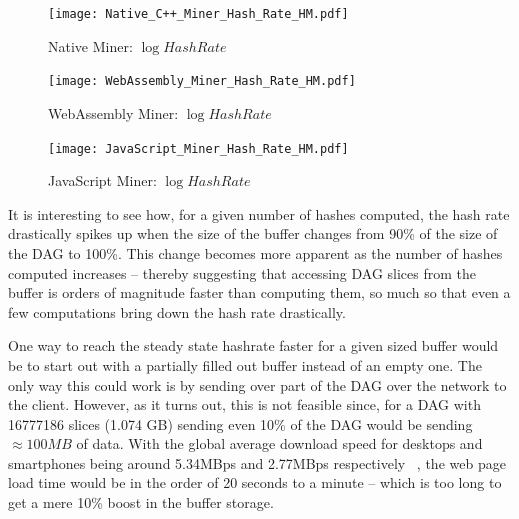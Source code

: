 \documentclass[runningheads]{llncs}
\begin{document}
\begin{figure}[h]
\centering
\texttt{[image: Native\_C++\_Miner\_Hash\_Rate\_HM.pdf]}
\caption{\label{fig:NativeMinerHM} Native Miner: $\log{Hash Rate}$}
\end{figure}

\begin{figure}[h]
\centering
\texttt{[image: WebAssembly\_Miner\_Hash\_Rate\_HM.pdf]}
\caption{\label{fig:WebAsmMinerHM} WebAssembly Miner: $\log{Hash Rate}$}
\end{figure}

\begin{figure}[h]
\centering
\texttt{[image: JavaScript\_Miner\_Hash\_Rate\_HM.pdf]}
\caption{\label{fig:JSMinerHM} JavaScript Miner: $\log{Hash Rate}$}
\end{figure}


It is interesting to see how, for a given number of hashes computed, the hash rate drastically spikes up when the size of the buffer changes from 90\% of the size of the DAG to 100\%. This change becomes more apparent as the number of hashes computed increases -- thereby suggesting that accessing DAG slices from the buffer is orders of magnitude faster than computing them, so much so that even a few computations bring down the hash rate drastically. 

One way to reach the steady state hashrate faster for a given sized buffer would be to start out with a partially filled out buffer instead of an empty one. The only way this could work is by sending over part of the DAG over the network to the client. However, as it turns out, this is not feasible since, for a DAG with 16777186 slices (1.074 GB) sending even 10\% of the DAG would be sending $\approx100MB$ of data. With the global average download speed for desktops and smartphones being around 5.34MBps and 2.77MBps respectively ~\cite{internetSpeed}, the web page load time would be in the order of 20 seconds to a minute -- which is too long to get a mere 10\% boost in the buffer storage. 
\end{document}
